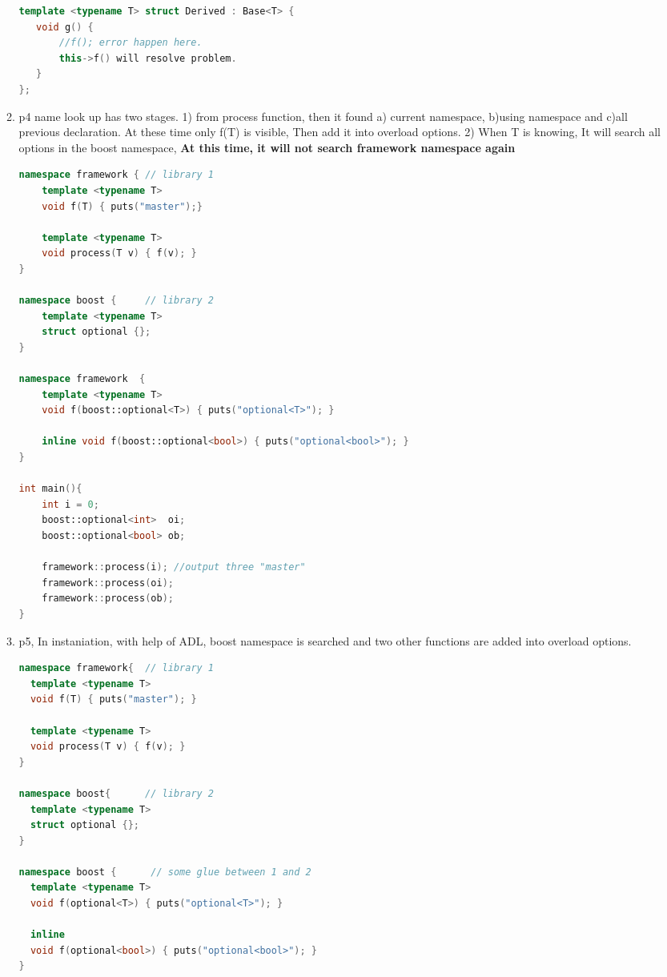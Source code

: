 \documentclass[a4paper,11pt,twoside]{book}
\begin{document}
\begin{itemize}
\begin{enumerate}
\begin{lstlisting}[frame=single, language=c++]
template <typename T> struct Derived : Base<T> {
   void g() {
       //f(); error happen here. 
       this->f() will resolve problem.
   }
};
\end{lstlisting}


\item p4 name look up has two stages. 1) from process function, then it found a) current namespace, b)using namespace and c)all previous declaration.  At these time only f(T) is visible, Then add it into overload options.  2) When T is knowing, It will search all options in the boost namespace, \textbf{At this time, it will not search framework namespace again}

\begin{lstlisting}[frame=single, language=c++]
namespace framework { // library 1
	template <typename T>
	void f(T) { puts("master");}
 
	template <typename T>
	void process(T v) { f(v); }
}
 
namespace boost {     // library 2
	template <typename T>
	struct optional {};
}
 
namespace framework  {     
	template <typename T>
	void f(boost::optional<T>) { puts("optional<T>"); }
    
	inline void f(boost::optional<bool>) { puts("optional<bool>"); }
}
 
int main(){
	int i = 0;
	boost::optional<int>  oi;
	boost::optional<bool> ob;
  
	framework::process(i); //output three "master"
	framework::process(oi);
	framework::process(ob);
}
\end{lstlisting}


\item p5, In instaniation, with help of ADL, boost namespace is searched and two other functions are added into overload options.

\begin{lstlisting}[frame=single, language=c++]
namespace framework{  // library 1
  template <typename T>
  void f(T) { puts("master"); }
 
  template <typename T>
  void process(T v) { f(v); } 
}
 
namespace boost{      // library 2
  template <typename T>
  struct optional {};
}
 
namespace boost {      // some glue between 1 and 2
  template <typename T>
  void f(optional<T>) { puts("optional<T>"); }
    
  inline
  void f(optional<bool>) { puts("optional<bool>"); }
}
 

\end{lstlisting}
\end{enumerate}
\end{itemize}
\end{document}
